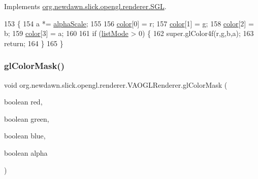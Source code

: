 Implements \mbox{\hyperlink{interfaceorg_1_1newdawn_1_1slick_1_1opengl_1_1renderer_1_1_s_g_l_a0dab1e4788ac76db632800701d9b959d}{org.\+newdawn.\+slick.\+opengl.\+renderer.\+S\+GL}}.


\begin{DoxyCode}
153                                                               \{
154         a *= \mbox{\hyperlink{classorg_1_1newdawn_1_1slick_1_1opengl_1_1renderer_1_1_immediate_mode_o_g_l_renderer_aa1772629fe3d1481ba6b0688fedcfb23}{alphaScale}};
155         
156         \mbox{\hyperlink{classorg_1_1newdawn_1_1slick_1_1opengl_1_1renderer_1_1_v_a_o_g_l_renderer_aff2f26ed4c579285e854a123093f3315}{color}}[0] = r;
157         \mbox{\hyperlink{classorg_1_1newdawn_1_1slick_1_1opengl_1_1renderer_1_1_v_a_o_g_l_renderer_aff2f26ed4c579285e854a123093f3315}{color}}[1] = g;
158         \mbox{\hyperlink{classorg_1_1newdawn_1_1slick_1_1opengl_1_1renderer_1_1_v_a_o_g_l_renderer_aff2f26ed4c579285e854a123093f3315}{color}}[2] = b;
159         \mbox{\hyperlink{classorg_1_1newdawn_1_1slick_1_1opengl_1_1renderer_1_1_v_a_o_g_l_renderer_aff2f26ed4c579285e854a123093f3315}{color}}[3] = a;
160         
161         \textcolor{keywordflow}{if} (\mbox{\hyperlink{classorg_1_1newdawn_1_1slick_1_1opengl_1_1renderer_1_1_v_a_o_g_l_renderer_afee8361b229cada04ad11d9ee44c7284}{listMode}} > 0) \{
162             super.glColor4f(r,g,b,a);
163             \textcolor{keywordflow}{return};
164         \}
165     \}
\end{DoxyCode}
\mbox{\label{classorg_1_1newdawn_1_1slick_1_1opengl_1_1renderer_1_1_v_a_o_g_l_renderer_a2929c99eb57e57280ade156ba6ebd46a}} 
\subsubsection{\texorpdfstring{gl\+Color\+Mask()}{glColorMask()}}
{\footnotesize\ttfamily void org.\+newdawn.\+slick.\+opengl.\+renderer.\+V\+A\+O\+G\+L\+Renderer.\+gl\+Color\+Mask (\begin{DoxyParamCaption}\item[{boolean}]{red,  }\item[{boolean}]{green,  }\item[{boolean}]{blue,  }\item[{boolean}]{alpha }\end{DoxyParamCaption})\hspace{0.3cm}{\ttfamily [inline]}}

